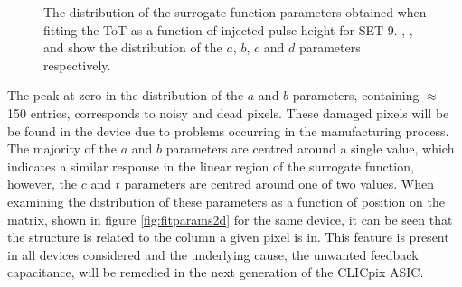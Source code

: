 \begin{figure}[h!]
\label{fig:fitparams}
\caption[The distribution of the surrogate function parameters obtained when fitting the ToT as a function of injected pulse height for SET 9.  \protect{}, \protect{}, \protect{} and \protect{} show the distribution of the $a$, $b$, $c$ and $d$ parameters respectively.]{The distribution of the surrogate function parameters obtained when fitting the ToT as a function of injected pulse height for SET 9.  \protect{}, \protect{}, \protect{} and \protect{} show the distribution of the $a$, $b$, $c$ and $d$ parameters respectively.}  
\end{figure}

The peak at zero in the distribution of the $a$ and $b$ parameters, containing $\approx$ 150 entries, corresponds to noisy and dead pixels.  These damaged pixels will be be found in the device due to problems occurring in the manufacturing process.  The majority of the $a$ and $b$ parameters are centred around a single value, which indicates a similar response in the linear region of the surrogate function, however, the $c$ and $t$ parameters are centred around one of two values.  When examining the distribution of these parameters as a function of position on the matrix, shown in figure \ref{fig:fitparams2d} for the same device, it can be seen that the structure is related to the column a given pixel is in.  This feature is present in all devices considered and the underlying cause, the unwanted feedback capacitance, will be remedied in the next generation of the CLICpix ASIC.

